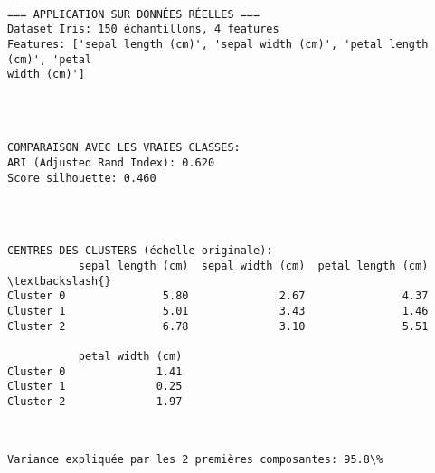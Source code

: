 \documentclass[11pt]{article}
\begin{document}
    \begin{Verbatim}[commandchars=\\\{\}]

=== APPLICATION SUR DONNÉES RÉELLES ===
Dataset Iris: 150 échantillons, 4 features
Features: ['sepal length (cm)', 'sepal width (cm)', 'petal length (cm)', 'petal
width (cm)']
    \end{Verbatim}

    \begin{center}
    \end{center}
    { \hspace*{\fill} \\}
    
    \begin{Verbatim}[commandchars=\\\{\}]

COMPARAISON AVEC LES VRAIES CLASSES:
ARI (Adjusted Rand Index): 0.620
Score silhouette: 0.460
    \end{Verbatim}

    \begin{center}
    \end{center}
    { \hspace*{\fill} \\}
    
    \begin{Verbatim}[commandchars=\\\{\}]

CENTRES DES CLUSTERS (échelle originale):
           sepal length (cm)  sepal width (cm)  petal length (cm)  \textbackslash{}
Cluster 0               5.80              2.67               4.37
Cluster 1               5.01              3.43               1.46
Cluster 2               6.78              3.10               5.51

           petal width (cm)
Cluster 0              1.41
Cluster 1              0.25
Cluster 2              1.97
    \end{Verbatim}

    \begin{center}
    \end{center}
    { \hspace*{\fill} \\}
    
    \begin{Verbatim}[commandchars=\\\{\}]
Variance expliquée par les 2 premières composantes: 95.8\%
    \end{Verbatim}
\end{document}
